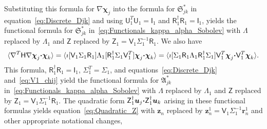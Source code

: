 \documentclass[english,12pt,jmp,graphicx]{revtex4-1}
\newcommand{\vecu}{\boldsymbol{u}}
\newcommand{\vecz}{\boldsymbol{z}}
\newcommand{\bcdot}{\mbox{\boldmath${\cdot}$}}
\newcommand{\Sg}{\mathfrak{S}}
\newcommand{\Ag}{\mathfrak{A}}
\newcommand{\vecchi}{\boldsymbol{\chi}}
\newcommand{\vecr}{\boldsymbol{r}}
\newcommand{\Hm}{\mathsf{H}}
\newcommand{\Um}{\mathsf{U}}
\newcommand{\Vm}{\mathsf{V}}
\newcommand{\Zm}{\mathsf{Z}}
\newcommand{\Rm}{\mathsf{R}}
\newcommand{\Ib}{\mathsf{I}}
\begin{document}
Substituting this formula for $\nabla\vecchi_j$
into the formula for $\Sg^*_{jk}$ in
equation~\eqref{eq:Discrete_Djk} and using $\Um_1^T\Um_1=\Ib_1$ and
$\Rm_1^\dagger\Rm_1=\Ib_1$, yields the functional formula for
$\Sg^*_{jk}$ in~\eqref{eq:Functionals_kappa_alpha_Sobolev}
with $\Lambda$ replaced by $\Lambda_1$ and $\Zm$ replaced by
$\Zm_1=\Vm_1\Sigma_1^{-1}\Rm_1$.
We also have 
%
\begin{align}
  \langle\nabla^T\Hm\nabla\vecchi_j\bcdot\vecchi_k\rangle
   =\langle\imath[\Vm_1\Sigma_1\Rm_1]
           \Lambda_1[\Rm_1^\dagger\Sigma_1\Vm_1^T]\vecchi_j\bcdot\vecchi_k
     \rangle
   =\langle\imath[\Sigma_1\Rm_1\Lambda_1\Rm_1^\dagger\Sigma_1]
           \Vm_1^T\vecchi_j\bcdot\Vm_1^T\vecchi_k
    \rangle.
\end{align}
%
This formula, $\Rm_1^\dagger\Rm_1=\Ib_1$, $\Sigma_1^T=\Sigma_1$, and 
equations~\eqref{eq:Discrete_Djk} and~\eqref{eq:V1_chij}
yield the functional formula for $\Ag^*_{jk}$
in~\eqref{eq:Functionals_kappa_alpha_Sobolev} with $\Lambda$ replaced
by $\Lambda_1$ and $\Zm$ replaced by $\Zm_1=\Vm_1\Sigma_1^{-1}\Rm_1$.
The quadratic form $\Zm_1^\dagger\vecu_j\bcdot\Zm_1^\dagger\vecu_k$ arising
in these functional formulas yields
equation~\eqref{eq:Quadratic_Z} with $\vecz_n$ replaced by
$\vecz_n^1=\Vm_1\Sigma_1^{-1}\vecr_n^1$ and other appropriate
notational changes,
\end{document}
